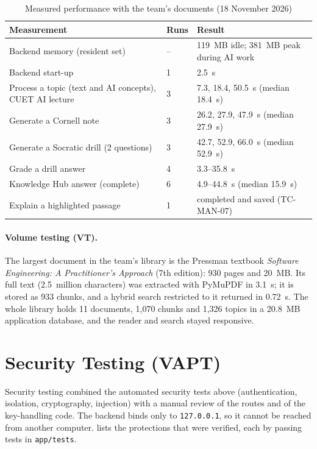 \begin{table}[!htbp]
\centering
\caption{Measured performance with the team's documents (18 November 2026)}\label{tab:perf}
\small
\begin{tabularx}{\textwidth}{@{}X l l@{}}
\toprule
\textbf{Measurement} & \textbf{Runs} & \textbf{Result}\\
\midrule
Backend memory (resident set) & -- & 119~MB idle; 381~MB peak during AI work\\
Backend start-up & 1 & 2.5~s\\
Process a topic (text and AI concepts), CUET AI lecture & 3 & 7.3, 18.4, 50.5~s (median 18.4~s)\\
Generate a Cornell note & 3 & 26.2, 27.9, 47.9~s (median 27.9~s)\\
Generate a Socratic drill (2 questions) & 3 & 42.7, 52.9, 66.0~s (median 52.9~s)\\
Grade a drill answer & 4 & 3.3--35.8~s\\
Knowledge Hub answer (complete) & 6 & 4.9--44.8~s (median 15.9~s)\\
Explain a highlighted passage & 1 & completed and saved (TC-MAN-07)\\
\bottomrule
\end{tabularx}
\end{table}

\paragraph{Volume testing (VT).} The largest document in the team's library is the Pressman textbook
\emph{Software Engineering: A Practitioner's Approach} (7th edition): 930 pages and 20~MB. Its full text
(2.5~million characters) was extracted with PyMuPDF in 3.1~s; it is stored as 933 chunks, and a hybrid search
restricted to it returned in 0.72~s. The whole library holds 11 documents, 1{,}070 chunks and 1{,}326 topics in
a 20.8~MB application database, and the reader and search stayed responsive.

\section{Security Testing (VAPT)}\label{sec:vapt}

Security testing combined the automated security tests above (authentication, isolation, cryptography,
injection) with a manual review of the routes and of the key-handling code. The backend binds only to
\texttt{127.0.0.1}, so it cannot be reached from another computer.  lists the protections that
were verified, each by passing tests in \texttt{app/tests}.

